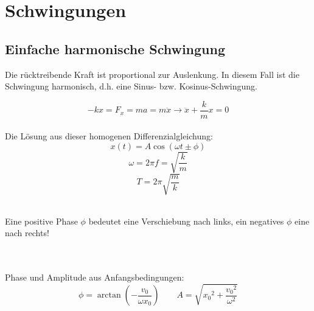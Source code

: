 



\chapter{Schwingungen}

\section{Einfache harmonische Schwingung}
Die rücktreibende Kraft ist proportional zur Auslenkung. In diesem Fall ist die Schwingung harmonisch, d.h. eine Sinus- bzw. Kosinus-Schwingung.

\[
	-kx = F_x = ma = m \ddot{x} \rightarrow \ddot{x} + \frac{k}{m}x = 0
\]
\\
Die Lösung aus dieser homogenen Differenzialgleichung:
\[\boxed{
	x(t) = A \cos(\omega t \pm \phi)
}\]
\[\boxed{
	\omega = 2 \pi f = \sqrt{\frac{k}{m}}
}\]
\[\boxed{
	T = 2 \pi \sqrt{\frac{m}{k}}
}\]
\\
\begin{footnotesize}
	Eine positive Phase $\phi$ bedeutet eine Verschiebung nach links, ein negatives $\phi$ eine nach rechts!
\end{footnotesize}
\\
\\
Phase und Amplitude aus Anfangsbedingungen:
\[\boxed{
	\phi = \arctan \left( - \frac{v_0}{\omega x_0} \right)\qquad 
	A = \sqrt{{x_0}^2+\frac{{v_0}^2}{\omega^2}}
}\]



